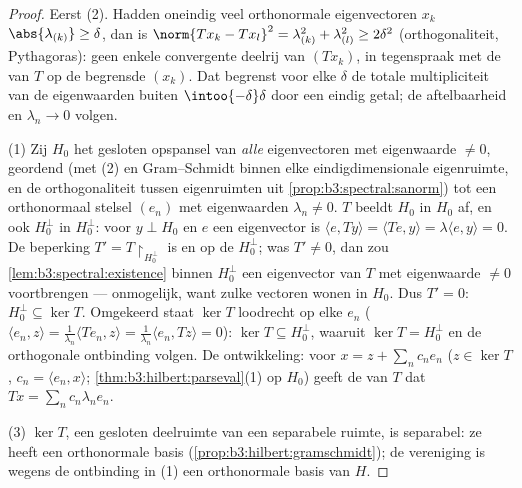 \begin{proof}
Eerst (2). Hadden oneindig veel orthonormale eigenvectoren $x_k$
$\abs{\lambda_{(k)}} \geq \delta$, dan is $\norm{Tx_k - Tx_l}^2 =
\lambda_{(k)}^2 + \lambda_{(l)}^2 \geq 2\delta^2$
(orthogonaliteit, Pythagoras): geen enkele convergente deelrij
van $(Tx_k)$, in tegenspraak met de  van $T$ op de
begrensde $(x_k)$. Dat begrenst voor elke $\delta$ de totale
multipliciteit van de eigenwaarden buiten $\intoo{-\delta}\delta$
door een eindig getal; de aftelbaarheid en $\lambda_n \to 0$
volgen.

(1) Zij $H_0$ het gesloten opspansel van \emph{alle}
eigenvectoren met eigenwaarde $\neq 0$, geordend (met (2) en
Gram--Schmidt binnen elke eindigdimensionale eigenruimte, en de
orthogonaliteit tussen eigenruimten uit
\cref{prop:b3:spectral:sanorm}) tot een orthonormaal stelsel
$(e_n)$ met eigenwaarden $\lambda_n \neq 0$. $T$ beeldt $H_0$ in
$H_0$ af, en ook $H_0^\perp$ in $H_0^\perp$: voor $y \perp H_0$
en $e$ een eigenvector is $\langle e, Ty\rangle = \langle Te,
y\rangle = \lambda\langle e, y\rangle = 0$. De beperking $T' =
T\restriction_{H_0^\perp}$ is  en  op de
 $H_0^\perp$; was $T' \neq 0$, dan zou
\cref{lem:b3:spectral:existence} binnen $H_0^\perp$ een
eigenvector van $T$ met eigenwaarde $\neq 0$ voortbrengen ---
onmogelijk, want zulke vectoren wonen in $H_0$. Dus $T' = 0$:
$H_0^\perp \subseteq \ker T$. Omgekeerd staat $\ker T$ loodrecht
op elke $e_n$ ($\langle e_n, z\rangle = \frac1{\lambda_n}\langle
Te_n, z\rangle = \frac1{\lambda_n}\langle e_n, Tz\rangle = 0$):
$\ker T \subseteq H_0^\perp$, waaruit $\ker T = H_0^\perp$ en de
orthogonale ontbinding volgen. De ontwikkeling: voor $x = z +
\sum_nc_ne_n$ ($z \in \ker T$, $c_n = \langle e_n, x\rangle$;
\cref{thm:b3:hilbert:parseval}(1) op $H_0$) geeft de 
van $T$ dat $Tx = \sum_nc_n\lambda_ne_n$.

(3) $\ker T$, een gesloten deelruimte van een separabele ruimte,
is separabel: ze heeft een orthonormale basis
(\cref{prop:b3:hilbert:gramschmidt}); de vereniging is wegens de
ontbinding in (1) een orthonormale basis van $H$.
\end{proof}

